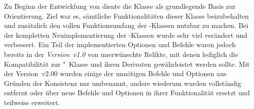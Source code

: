 \begin{DeclareEntity}{}
\noindent{}

\bigskip\noindent
Zu Beginn der Entwicklung von \TUDScript diente die Klasse  als 
grundlegende Basis zur Orientierung. Ziel war es, sämtliche Funktionalitäten 
dieser Klasse beizubehalten und zusätzlich den vollen Funktionsumfang der 
\KOMAScript-Klassen nutzbar zu machen. Bei der kompletten Neuimplementierung 
der \TUDScript-Klassen wurde sehr viel verändert und verbessert. Ein Teil der 
implementierten Optionen und Befehle waren jedoch bereits in der 
\emph{Version~v1.0} von \TUDScript unerwünschte Relikte, mit denen lediglich 
die Kompatibilität zur "~Klasse und ihren Derivaten 
gewährleistet werden sollte. Mit der Version~v2.00 wurden einige der unnötigen 
Befehle und Optionen aus Gründen der Konsistenz nur umbenannt, andere wiederum 
wurden vollständig entfernt oder über neue Befehle und Optionen in ihrer 
Funktionalität ersetzt und teilweise erweitert. 


\end{DeclareEntity}
